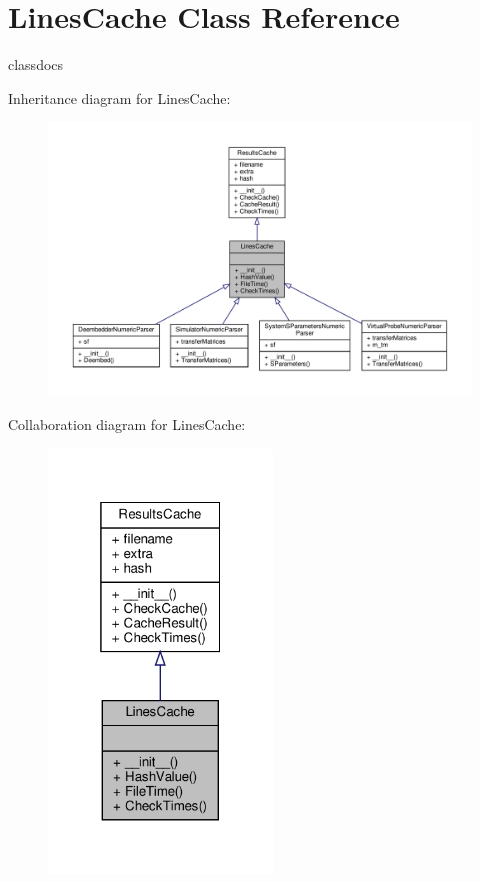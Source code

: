 \hypertarget{classSignalIntegrity_1_1ResultsCache_1_1LinesCache}{}\section{Lines\+Cache Class Reference}
\label{classSignalIntegrity_1_1ResultsCache_1_1LinesCache}


classdocs  




Inheritance diagram for Lines\+Cache\+:\nopagebreak
\begin{figure}[H]
\begin{center}
\leavevmode
\includegraphics[width=350pt]{classSignalIntegrity_1_1ResultsCache_1_1LinesCache__inherit__graph}
\end{center}
\end{figure}


Collaboration diagram for Lines\+Cache\+:\nopagebreak
\begin{figure}[H]
\begin{center}
\leavevmode
\includegraphics[width=169pt]{classSignalIntegrity_1_1ResultsCache_1_1LinesCache__coll__graph}
\end{center}
\end{figure}
